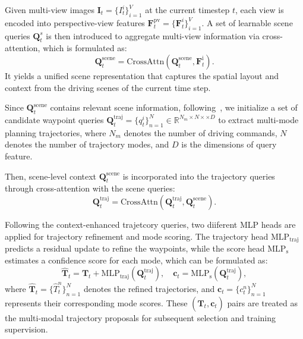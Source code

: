  Given multi-view images $\mathbf{I}_t=\{I_t^i\}_{i=1}^V$ at the current timestep $t$, each view is encoded into perspective-view features $\mathbf{F}_t^{\text{pv}} = \{\mathbf{F}_t^i\}_{i=1}^V$. A set of learnable scene queries $\mathbf{Q}^s_t$ is then introduced to aggregate multi-view information via cross-attention, which is formulated as:
\begin{equation}
\mathbf{Q}_t^{\text{scene}} = \mathrm{CrossAttn}(\mathbf{Q}_t^{\text{scene}}, \mathbf{F}_t^{\text{i}}).
\end{equation}
It yields a unified scene representation that captures the spatial layout and context from the driving scenes of the current time step.

 Since $\mathbf{Q}_t^{\text{scene}}$ contains relevant scene information, following~\cite{jiang2023vad, hu2023planning}, we initialize a set of candidate waypoint queries $\mathbf{Q}_t^{\text{traj}}=\{q_t^i\}_{n=1}^{N} \in \mathbb{R}^{N_m\times N \times \times D}$ to extract multi-mode planning trajectories, where $N_m$ denotes the number of driving commands, $N$ denotes the number of trajectory modes, and $D$ is the dimensions of query feature. %

Then, scene-level context $\mathbf{Q}_t^{\text{scene}}$ is incorporated into the trajectory queries through cross-attention with the scene queries:
\begin{equation}
\mathbf{Q}_t^{\text{traj}} = \mathrm{CrossAttn}(\mathbf{Q}_t^{\text{traj}}, \mathbf{Q}_t^{\text{scene}}).
\end{equation}

Following the context-enhanced trajetcory queries, two diiferent MLP heads are applied for trajectory refinement and mode scoring. The trajectory head $\mathrm{MLP}_{\text{traj}}$ predicts a residual update to refine the waypoints, while the score head $\mathrm{MLP}_{\text{s}}$ estimates a confidence score for each mode, which can be formulated as:
\begin{equation}
\hat{\mathbf{T}}_t = \mathbf{T}_t + \mathrm{MLP}_{\text{traj}}(\mathbf{Q}_t^{\text{traj}}), \quad
\mathbf{c}_t = \mathrm{MLP}_{\text{s}}(\mathbf{Q}_t^{\text{traj}}),
\end{equation}
where $\hat{\mathbf{T}}_t=\{\hat{T}_t^n\}_{n=1}^{N}$ denotes the refined trajectories, and $\mathbf{c}_t=\{c_t^n\}_{n=1}^{N}$ represents their corresponding mode scores. These $(\hat{\mathbf{T}}_t,\mathbf{c}_t)$ pairs are treated as the multi-modal trajectory proposals for subsequent selection and training supervision.

